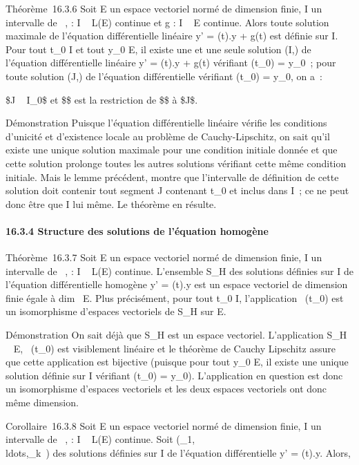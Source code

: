 Théorème~16.3.6 Soit E un espace vectoriel normé de dimension finie, I
un intervalle de ~, \ell : I \rightarrow~ L(E) continue et g : I \rightarrow~ E continue. Alors
toute solution maximale de l'équation différentielle linéaire y' =
\ell(t).y + g(t) est définie sur I. Pour tout t_0 \in I et tout
y_0 \in E, il existe une et une seule solution (I,\phi) de
l'équation différentielle linéaire y' = \ell(t).y + g(t) vérifiant
\phi(t_0) = y_0~; pour toute solution (J,\psi) de l'équation
différentielle vérifiant \psi(t_0) = y_0, on a~:

\text\$J \subset~ I_0\$ et \$\psi\$ est la restriction
de \$\phi\$ à \$J\$.

Démonstration Puisque l'équation différentielle linéaire vérifie les
conditions d'unicité et d'existence locale au problème de
Cauchy-Lipschitz, on sait qu'il existe une unique solution maximale pour
une condition initiale donnée et que cette solution prolonge toutes les
autres solutions vérifiant cette même condition initiale. Mais le lemme
précédent, montre que l'intervalle de définition de cette solution doit
contenir tout segment J contenant t_0 et inclus dans I~; ce ne
peut donc être que I lui même. Le théorème en résulte.

\paragraph{16.3.4 Structure des solutions de l'équation homogène}

Théorème~16.3.7 Soit E un espace vectoriel normé de dimension finie, I
un intervalle de ~, \ell : I \rightarrow~ L(E) continue. L'ensemble S_H des
solutions définies sur I de l'équation différentielle homogène y' =
\ell(t).y est un espace vectoriel de dimension finie égale à
dim~ E. Plus précisément, pour tout
t_0 \in I, l'application
\phi\mapsto~\phi(t_0) est un isomorphisme
d'espaces vectoriels de S_H sur E.

Démonstration On sait déjà que S_H est un espace vectoriel.
L'application S_H \rightarrow~ E,
\phi\mapsto~\phi(t_0) est visiblement linéaire et
le théorème de Cauchy Lipschitz assure que cette application est
bijective (puisque pour tout y_0 \in E, il existe une unique
solution définie sur I vérifiant \phi(t_0) = y_0).
L'application en question est donc un isomorphisme d'espaces vectoriels
et les deux espaces vectoriels ont donc même dimension.

Corollaire~16.3.8 Soit E un espace vectoriel normé de dimension finie, I
un intervalle de ~, \ell : I \rightarrow~ L(E) continue. Soit
(\phi_1,\\ldots,\phi_k~)
des solutions définies sur I de l'équation différentielle y' = \ell(t).y.
Alors,

